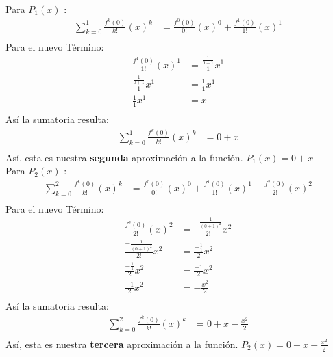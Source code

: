 Para $P_{1}(x)$ :
\begin{align*}
   \sum_{k=0}^{1} \frac{f^{k}(0)}{k!}(x)^{k} &= \frac{f^{0}(0)}{0!}(x)^{0} + \frac{f^{1}(0)}{1!}(x)^{1} \\
\end{align*}
Para el nuevo Término:
\begin{align*}
   \frac{f^{1}(0)}{1!}(x)^{1}                    &= \frac{\frac{1}{0+1}}{1}x^{1} \\
   \frac{\frac{1}{0+1}}{1}x^{1}                  &= \frac{1}{1}x^{1} \\
   \frac{1}{1}x^{1}                              &= x \\
\end{align*}
Así la sumatoria resulta:
\begin{align*}
   \sum_{k=0}^{1} \frac{f^{k}(0)}{k!}(x)^{k} &= 0 + x\\
\end{align*}
Así, esta es nuestra \textbf{segunda} aproximación a la función. $P_{1}(x) = 0 + x$ \\


Para $P_{2}(x)$ :
\begin{align*}
   \sum_{k=0}^{2} \frac{f^{k}(0)}{k!}(x)^{k} &= \frac{f^{0}(0)}{0!}(x)^{0} + \frac{f^{1}(0)}{1!}(x)^{1}  + \frac{f^{2}(0)}{2!}(x)^{2}\\
\end{align*}
Para el nuevo Término:
\begin{align*}
   \frac{f^{2}(0)}{2!}(x)^{2}                   &= \frac{-\frac{1}{(0+1)^{2}}}{2!}x^{2} \\
   \frac{-\frac{1}{(0+1)^{2}}}{2!}x^{2}         &= \frac{-\frac{1}{1}}{2}x^{2} \\
   \frac{-\frac{1}{1}}{2}x^{2}                  &= \frac{-1}{2}x^{2}  \\
   \frac{-1}{2}x^{2}                            &= -\frac{x^{2}}{2}\\
\end{align*}
Así la sumatoria resulta:
\begin{align*}
   \sum_{k=0}^{2} \frac{f^{k}(0)}{k!}(x)^{k} &= 0 + x -\frac{x^{2}}{2}\\
\end{align*}
Así, esta es nuestra \textbf{tercera} aproximación a la función. $P_{2}(x) = 0 + x -\frac{x^{2}}{2}$ \\

